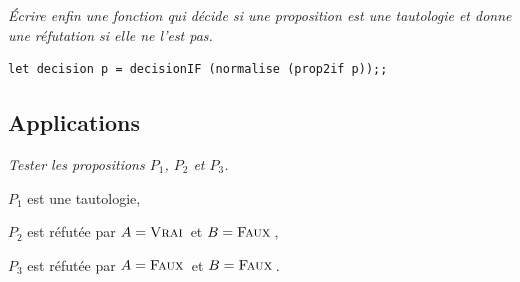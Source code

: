 \begin{Exercise}\it 
Écrire enfin une fonction  qui décide si une proposition est une tautologie et donne une réfutation si elle ne l'est pas.
\end{Exercise}
\begin{Answer} 
\begin{lstlisting}
let decision p = decisionIF (normalise (prop2if p));;
\end{lstlisting}
\end{Answer}
\subsection{Applications}
\begin{Exercise}\it
Tester les propositions $P_1$, $P_2$ et $P_3$.
\end{Exercise}
\begin{Answer} $P_1$ est une tautologie,

$P_2$ est réfutée par $A=\text{\sc Vrai}\,$ et $B=\text{\sc Faux}\,$, 

$P_3$ est réfutée par $A=\text{\sc Faux}\,$ et $B=\text{\sc Faux}\,$.

\newpage
\end{Answer}
